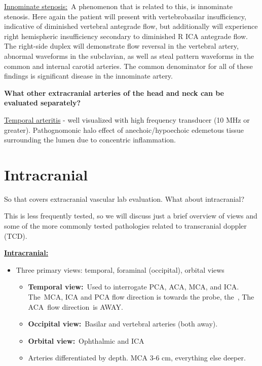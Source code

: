 \documentclass[
]{book}
\begin{document}
\uline{Innominate stenosis:}~A phenomenon that is related to this,
is innominate stenosis. Here again the patient will present with
vertebrobasilar insufficiency, indicative of diminished vertebral
antegrade flow, but additionally will experience right hemispheric
insufficiency secondary to diminished R ICA antegrade flow. The
right-side duplex will demonstrate flow reversal in the vertebral
artery, abnormal waveforms in the subclavian, as well as steal pattern
waveforms in the common and internal carotid arteries. The common
denominator for all of these findings is significant disease in the
innominate artery.

\textbf{What other extracranial arteries of the head and neck can be evaluated
separately?}

\uline{Temporal arteritis} - well visualized with high frequency
transducer (10 MHz or greater). Pathognomonic halo effect of
anechoic/hypoechoic edemetous tissue surrounding the lumen due to
concentric inflammation.\citep{ball2010, schmidt2014}

\hypertarget{intracranial}{%
\section{Intracranial}\label{intracranial}}

So that covers extracranial vascular lab evaluation. What about
intracranial?

This is less frequently tested, so we will discuss just a brief overview
of views and some of the more commonly tested pathologies related to
transcranial doppler (TCD).

\uline{\textbf{Intracranial:}}

\begin{itemize}
\item
  Three primary views: temporal, foraminal (occipital), orbital views

  \begin{itemize}
  \item
    \textbf{Temporal view:}~Used to interrogate PCA, ACA, MCA, and ICA.
    The~MCA, ICA and PCA flow direction is towards the probe, the~,
    The ACA~flow direction~is AWAY.
  \item
    \textbf{Occipital view:}~Basilar and vertebral arteries (both away).
  \item
    \textbf{Orbital view:}~Ophthalmic and ICA
  \item
    Arteries differentiated by depth. MCA 3-6 cm, everything else
    deeper.
  \end{itemize}
\end{itemize}
\end{document}
